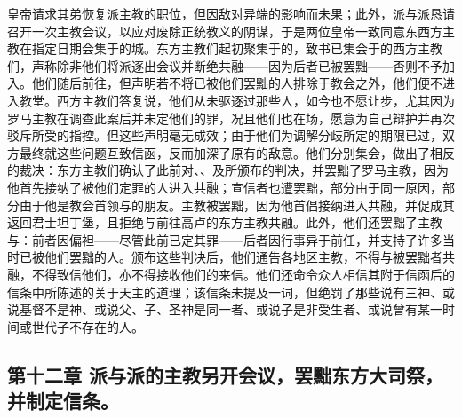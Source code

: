 皇帝请求其弟恢复派主教的职位，但因敌对异端的影响而未果；此外，派与派恳请召开一次主教会议，以应对废除正统教义的阴谋，于是两位皇帝一致同意东西方主教在指定日期会集于的城。东方主教们起初聚集于的，致书已集会于的西方主教们，声称除非他们将派逐出会议并断绝共融——因为后者已被罢黜——否则不予加入。他们随后前往，但声明若不将已被他们罢黜的人排除于教会之外，他们便不进入教堂。西方主教们答复说，他们从未驱逐过那些人，如今也不愿让步，尤其因为罗马主教在调查此案后并未定他们的罪，况且他们也在场，愿意为自己辩护并再次驳斥所受的指控。但这些声明毫无成效；由于他们为调解分歧所定的期限已过，双方最终就这些问题互致信函，反而加深了原有的敌意。他们分别集会，做出了相反的裁决：东方主教们确认了此前对、、及所颁布的判决，并罢黜了罗马主教，因为他首先接纳了被他们定罪的人进入共融；宣信者也遭罢黜，部分由于同一原因，部分由于他是教会首领与的朋友。主教被罢黜，因为他首倡接纳进入共融，并促成其返回君士坦丁堡，且拒绝与前往高卢的东方主教共融。此外，他们还罢黜了主教与：前者因偏袒——尽管此前已定其罪——后者因行事异于前任，并支持了许多当时已被他们罢黜的人。颁布这些判决后，他们通告各地区主教，不得与被罢黜者共融，不得致信他们，亦不得接收他们的来信。他们还命令众人相信其附于信函后的信条中所陈述的关于天主的道理；该信条未提及一词，但绝罚了那些说有三神、或说基督不是神、或说父、子、圣神是同一者、或说子是非受生者、或说曾有某一时间或世代子不存在的人。\par


\subsection{第十二章  派与派的主教另开会议，罢黜东方大司祭，并制定信条。}

